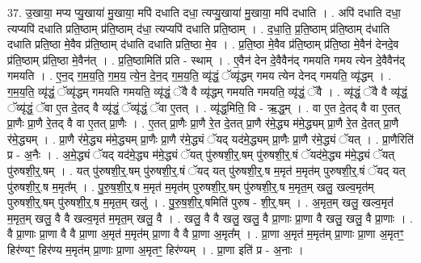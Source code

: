 \documentclass[17pt]{extarticle}
\begin{document}
37. उ॒खाया॒ मप्य प्यु॒खाया॑ मु॒खाया॒ मपि॑ दधाति दधा॒ त्यप्यु॒खाया॑ मु॒खाया॒ मपि॑ दधाति । . अपि॑ दधाति दधा॒ त्यप्यपि॑ दधाति प्रति॒ष्ठाम् प्र॑ति॒ष्ठाम् द॑धा॒ त्यप्यपि॑ दधाति प्रति॒ष्ठाम् । . द॒धा॒ति॒ प्र॒ति॒ष्ठाम् प्र॑ति॒ष्ठाम् द॑धाति दधाति प्रति॒ष्ठा मे॒वैव प्र॑ति॒ष्ठाम् द॑धाति दधाति प्रति॒ष्ठा मे॒व । . प्र॒ति॒ष्ठा मे॒वैव प्र॑ति॒ष्ठाम् प्र॑ति॒ष्ठा मे॒वैन॑ देनदे॒व प्र॑ति॒ष्ठाम् प्र॑ति॒ष्ठा मे॒वैन॑त् । . प्र॒ति॒ष्ठामिति॑ प्रति - स्थाम् । . ए॒वैन॑ देन दे॒वैवैन॑द् गमयति गमय त्येन दे॒वैवैन॑द् गमयति । . ए॒न॒द् ग॒म॒य॒ति॒ ग॒म॒य॒ त्ये॒न॒ दे॒न॒द् ग॒म॒य॒ति॒ व्यृ॑द्धं॒ ॅव्यृ॑द्धम् गमय त्येन देनद् गमयति॒ व्यृ॑द्धम् । . ग॒म॒य॒ति॒ व्यृ॑द्धं॒ ॅव्यृ॑द्धम् गमयति गमयति॒ व्यृ॑द्धं॒ ॅवै वै व्यृ॑द्धम् गमयति गमयति॒ व्यृ॑द्धं॒ ॅवै । . व्यृ॑द्धं॒ ॅवै वै व्यृ॑द्धं॒ ॅव्यृ॑द्धं॒ ॅवा ए॒त दे॒तद् वै व्यृ॑द्धं॒ ॅव्यृ॑द्धं॒ ॅवा ए॒तत् । . व्यृ॑द्ध॒मिति॒ वि - ऋ॒द्ध॒म् । . वा ए॒त दे॒तद् वै वा ए॒तत् प्रा॒णैः प्रा॒णै रे॒तद् वै वा ए॒तत् प्रा॒णैः । . ए॒तत् प्रा॒णैः प्रा॒णै रे॒त दे॒तत् प्रा॒णै र॑मे॒द्ध्य म॑मे॒द्ध्यम् प्रा॒णै रे॒त दे॒तत् प्रा॒णै र॑मे॒द्ध्यम् । . प्रा॒णै र॑मे॒द्ध्य म॑मे॒द्ध्यम् प्रा॒णैः प्रा॒णै र॑मे॒द्ध्यं ॅयद् यद॑मे॒द्ध्यम् प्रा॒णैः प्रा॒णै र॑मे॒द्ध्यं ॅयत् । . प्रा॒णैरिति॑ प्र - अ॒नैः । . अ॒मे॒द्ध्यं ॅयद् यद॑मे॒द्ध्य म॑मे॒द्ध्यं ॅयत् पु॑रुषशी॒र्॒.षम् पु॑रुषशी॒र्॒.षं ॅयद॑मे॒द्ध्य म॑मे॒द्ध्यं ॅयत् पु॑रुषशी॒र्॒.षम् । . यत् पु॑रुषशी॒र्॒.षम् पु॑रुषशी॒र्॒.षं ॅयद् यत् पु॑रुषशी॒र्॒.ष म॒मृत॑ म॒मृत॑म् पुरुषशी॒र्॒.षं ॅयद् यत् पु॑रुषशी॒र्॒.ष म॒मृत᳚म् । . पु॒रु॒ष॒शी॒र्॒.ष म॒मृत॑ म॒मृत॑म् पुरुषशी॒र्॒.षम् पु॑रुषशी॒र्॒.ष म॒मृत॒म् खलु॒ खल्व॒मृत॑म् पुरुषशी॒र्॒.षम् पु॑रुषशी॒र्॒.ष म॒मृत॒म् खलु॑ । . पु॒रु॒ष॒शी॒र्॒.षमिति॑ पुरुष - शी॒र्॒.षम् । . अ॒मृत॒म् खलु॒ खल्व॒मृत॑ म॒मृत॒म् खलु॒ वै वै खल्व॒मृत॑ म॒मृत॒म् खलु॒ वै । . खलु॒ वै वै खलु॒ खलु॒ वै प्रा॒णाः प्रा॒णा वै खलु॒ खलु॒ वै प्रा॒णाः । . वै प्रा॒णाः प्रा॒णा वै वै प्रा॒णा अ॒मृत॑ म॒मृत॑म् प्रा॒णा वै वै प्रा॒णा अ॒मृत᳚म् । . प्रा॒णा अ॒मृत॑ म॒मृत॑म् प्रा॒णाः प्रा॒णा अ॒मृतꣳ॒॒ हिर॑ण्यꣳ॒॒ हिर॑ण्य म॒मृत॑म् प्रा॒णाः प्रा॒णा अ॒मृतꣳ॒॒ हिर॑ण्यम् । . प्रा॒णा इति॑ प्र - अ॒नाः । \newline
\pagebreak
{}
\end{document}
